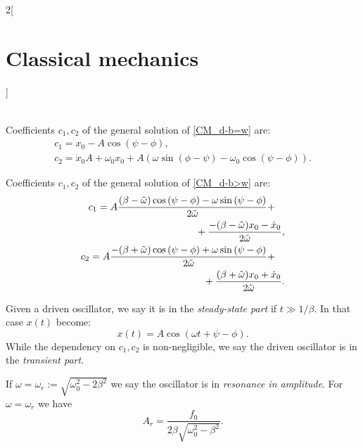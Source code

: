 \documentclass[../../../main.tex]{subfiles}
\begin{document}
\begin{multicols}{2}[\section{Classical mechanics}]
\begin{prop}
\begin{gather*}
        \end{gather*}
    \end{prop}
    \begin{prop}
        Coefficients $c_1,c_2$ of the general solution of \cref{CM_d-b=w} are:
        \begin{gather*}
            c_1=x_0-A\cos\left(\psi-\phi\right),\\
            c_2=\dot{x}_0A+\omega_0x_0+A\left(\omega\sin\left(\phi-\psi\right)-\omega_0\cos\left(\psi-\phi\right)\right).
        \end{gather*}
    \end{prop}
    \begin{prop}
        Coefficients $c_1,c_2$ of the general solution of \cref{CM_d-b>w} are:
        \begin{equation*}
            \begin{split}
                \begin{multlined}[t]
                    c_1=A\frac{(\beta-\Tilde{\omega})\cos\left(\psi-\phi\right)-\omega\sin\left(\psi-\phi\right)}{2\Tilde{\omega}}+\\+\frac{-(\beta-\Tilde{\omega})x_0-\dot{x}_0}{2\Tilde{\omega}},
                \end{multlined}\\
                \begin{multlined}[t]
                    c_2=A\frac{-(\beta+\Tilde{\omega})\cos\left(\psi-\phi\right)+\omega\sin\left(\psi-\phi\right)}{2\Tilde{\omega}}+\\+\frac{(\beta+\Tilde{\omega})x_0+\dot{x}_0}{2\Tilde{\omega}}.
                \end{multlined}
            \end{split}
        \end{equation*}
    \end{prop}
    \begin{definition}
        Given a driven oscillator, we say it is in the \textit{steady-state part} if $t\gg 1/\beta$. In that case $x(t)$ become: $$x(t)=A\cos(\omega t+\psi-\phi).$$ While the dependency on $c_1,c_2$ is non-negligible, we say the driven oscillator is in the \textit{transient part}.
    \end{definition}
    \begin{prop}
        If $\omega=\omega_r:=\sqrt{\omega_0^2-2\beta^2}$ we say the oscillator is in \textit{resonance in amplitude}. For $\omega=\omega_r$ we have $$A_r=\frac{f_0}{2\beta\sqrt{\omega_0^2-\beta^2}}.$$

\end{prop}
\end{multicols}
\end{document}
